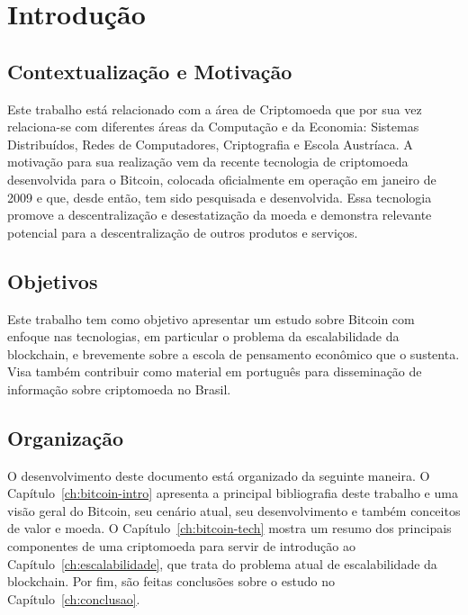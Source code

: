 \chapter{Introdução}
\label{ch:introducao}

\section{Contextualização e Motivação}

Este trabalho está relacionado com a área de Criptomoeda que por sua vez relaciona-se com diferentes áreas da Computação e da Economia: Sistemas Distribuídos, Redes de Computadores, Criptografia e Escola Austríaca. A motivação para sua realização vem da recente tecnologia de criptomoeda desenvolvida para o Bitcoin, colocada oficialmente em operação em janeiro de 2009 e que, desde então, tem sido pesquisada e desenvolvida. Essa tecnologia promove a descentralização e desestatização da moeda e demonstra relevante potencial para a descentralização de outros produtos e serviços.

\section{Objetivos}

Este trabalho tem como objetivo apresentar um estudo sobre Bitcoin com enfoque nas tecnologias, em particular o problema da escalabilidade da blockchain, e brevemente sobre a escola de pensamento econômico que o sustenta. Visa também contribuir como material em português para disseminação de informação sobre criptomoeda no Brasil.

\section{Organização}

O desenvolvimento deste documento está organizado da seguinte maneira. O Capítulo~\ref{ch:bitcoin-intro} apresenta a principal bibliografia deste trabalho e uma visão geral do Bitcoin, seu cenário atual, seu desenvolvimento e também conceitos de valor e moeda. O Capítulo~\ref{ch:bitcoin-tech} mostra um resumo dos principais componentes de uma criptomoeda para servir de introdução ao Capítulo~\ref{ch:escalabilidade}, que trata do problema atual de escalabilidade da blockchain. Por fim, são feitas conclusões sobre o estudo no Capítulo~\ref{ch:conclusao}.